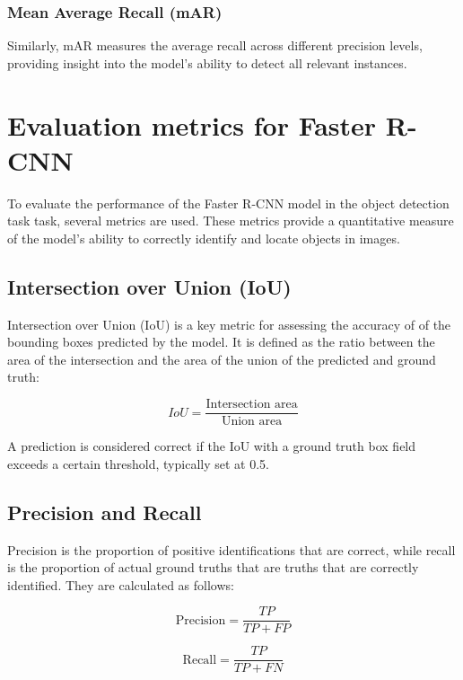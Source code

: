 \documentclass[12pt,oneside]{book} %
\begin{document}
\subsubsection{Mean Average Recall (mAR)}
Similarly, mAR measures the average recall across different precision levels,
providing insight into the model's ability to detect all relevant instances.

\section{Evaluation metrics for Faster R-CNN}

To evaluate the performance of the Faster R-CNN model in the object detection
task task, several metrics are used. These metrics provide a quantitative
measure of the model's ability to correctly identify and locate objects in
images.

\subsection{Intersection over Union (IoU)}

Intersection over Union (IoU) is a key metric for assessing the accuracy of of
the bounding boxes predicted by the model. It is defined as the ratio between
the area of the intersection and the area of the union of the predicted and
ground truth:

\begin{equation}
    IoU = \frac{\text{Intersection area}}{\text{Union area}}
\end{equation}

A prediction is considered correct if the IoU with a ground truth box field
exceeds a certain threshold, typically set at 0.5.

\subsection{Precision and Recall}

Precision is the proportion of positive identifications that are correct, while
recall is the proportion of actual ground truths that are truths that are
correctly identified. They are calculated as follows:

\begin{equation}
    \text{Precision} = \frac{TP}{TP + FP}
\end{equation}

\begin{equation}
    \text{Recall} = \frac{TP}{TP + FN}
\end{equation}
\end{document}
